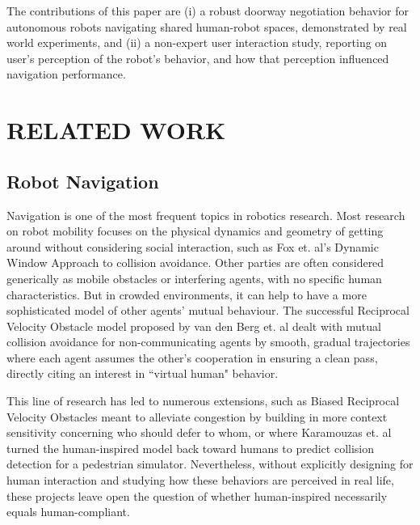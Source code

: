\documentclass[letterpaper, 10 pt, conference]{ieeeconf}  %
\begin{document}
The contributions of this paper are (i) a robust doorway negotiation behavior for autonomous robots navigating shared human-robot spaces, demonstrated by real world experiments, and (ii) a non-expert user interaction study, reporting on user's perception of the robot’s behavior, and how that perception influenced navigation performance.

\section{RELATED WORK}


\subsection{Robot Navigation}

Navigation is one of the most frequent topics in robotics research. Most research on robot mobility focuses on the physical dynamics and geometry of getting around without considering social interaction, such as Fox et. al's Dynamic Window Approach to collision avoidance\cite{fox1997dynamic}. Other parties are often considered generically as mobile obstacles or interfering agents, with no specific human characteristics. But in crowded environments, it can help to have a more sophisticated model of other agents' mutual behaviour. The successful Reciprocal Velocity Obstacle model proposed by van den Berg et. al\cite{van2008reciprocal} dealt with mutual collision avoidance for non-communicating agents by smooth, gradual trajectories where each agent assumes the other’s cooperation in ensuring a clean pass, directly citing an interest in ``virtual human" behavior. 

This line of research has led to numerous extensions, such as Biased Reciprocal Velocity Obstacles\cite{sadat2012bravo} meant to alleviate congestion by building in more context sensitivity concerning who should defer to whom, or where Karamouzas et. al\cite{karamouzas2009predictive} turned the human-inspired model back toward humans to predict collision detection for a pedestrian simulator. Nevertheless, without explicitly designing for human interaction and studying how these behaviors are perceived in real life, these projects leave open the question of whether human-inspired necessarily equals human-compliant.
\end{document}
